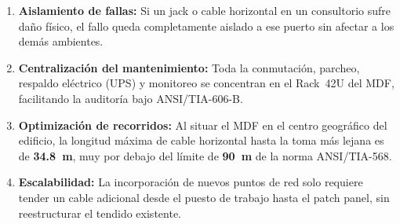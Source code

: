\begin{enumerate}[leftmargin=*, label=\arabic*.]
    \item \textbf{Aislamiento de fallas:} Si un jack o cable horizontal en un consultorio sufre daño físico, el fallo queda completamente aislado a ese puerto sin afectar a los demás ambientes.
    \item \textbf{Centralización del mantenimiento:} Toda la conmutación, parcheo, respaldo eléctrico (UPS) y monitoreo se concentran en el Rack~42U del MDF, facilitando la auditoría bajo ANSI/TIA-606-B.
    \item \textbf{Optimización de recorridos:} Al situar el MDF en el centro geográfico del edificio, la longitud máxima de cable horizontal hasta la toma más lejana es de \textbf{34.8~m}, muy por debajo del límite de \textbf{90~m} de la norma ANSI/TIA-568.
    \item \textbf{Escalabilidad:} La incorporación de nuevos puntos de red solo requiere tender un cable adicional desde el puesto de trabajo hasta el patch panel, sin reestructurar el tendido existente.
\end{enumerate}

